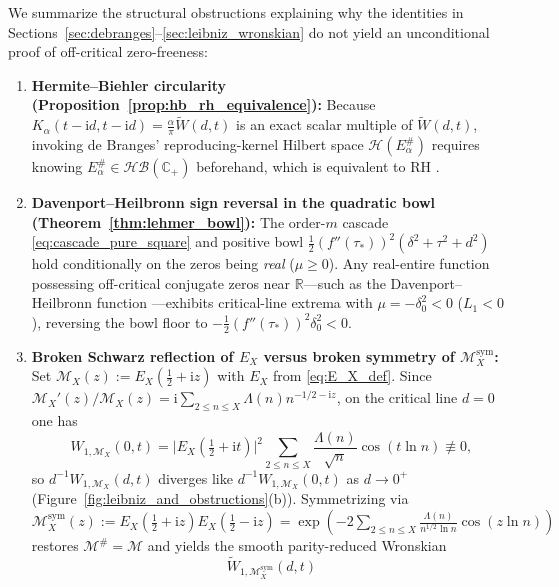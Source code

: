 \documentclass[11pt,reqno]{amsart}
\theoremstyle{definition}
\theoremstyle{remark}
\numberwithin{equation}{section}
\newcommand{\ii}{\mathrm{i}}
\begin{document}
We summarize the structural obstructions explaining why the identities in Sections~\ref{sec:debranges}--\ref{sec:leibniz_wronskian} do not yield an unconditional proof of off-critical zero-freeness:
\begin{enumerate}[label=\textup{(\arabic*)},leftmargin=2.2em]
  \item \textbf{Hermite--Biehler circularity (Proposition~\ref{prop:hb_rh_equivalence}):} Because $K_\alpha(t-\ii d, t-\ii d) = \frac{\alpha}{\pi}\widetilde{W}(d,t)$ is an exact scalar multiple of $\widetilde{W}(d,t)$, invoking de Branges' reproducing-kernel Hilbert space $\mathcal{H}(E_\alpha^\#)$ requires knowing $E_\alpha^\# \in \mathcal{HB}(\mathbb{C}_+)$ beforehand, which is equivalent to RH \cite{Levinson1974,Lagarias2005,Lagarias2006}.
  \item \textbf{Davenport--Heilbronn sign reversal in the quadratic bowl (Theorem~\ref{thm:lehmer_bowl}):} The order-$m$ cascade \eqref{eq:cascade_pure_square} and positive bowl $\frac{1}{2}(f''(\tau_*))^2(\delta^2 + \tau^2 + d^2)$ hold conditionally on the zeros being \emph{real} ($\mu \ge 0$). Any real-entire function possessing off-critical conjugate zeros near $\mathbb{R}$---such as the Davenport--Heilbronn function \cite{DavenportHeilbronn1936,Titchmarsh1986}---exhibits critical-line extrema with $\mu = -\delta_0^2 < 0$ ($L_1 < 0$), reversing the bowl floor to $-\frac{1}{2}(f''(\tau_*))^2\delta_0^2 < 0$.
  \item \textbf{Broken Schwarz reflection of $E_X$ versus broken symmetry of $\mathcal{M}_X^{\mathrm{sym}}$:} Set $\mathcal{M}_X(z) := E_X(\frac{1}{2}+\ii z)$ with $E_X$ from \eqref{eq:E_X_def}. Since $\mathcal{M}_X'(z)/\mathcal{M}_X(z) = \ii\sum_{2\le n\le X}\Lambda(n)n^{-1/2-\ii z}$, on the critical line $d = 0$ one has
  \begin{equation}\label{eq:W_1E_d0_nonzero}
    W_{1,\mathcal{M}_X}(0,t) = \bigl\lvert E_X(\tfrac{1}{2}+\ii t)\bigr\rvert^2 \sum_{2 \le n \le X}\frac{\Lambda(n)}{\sqrt{n}}\cos(t\ln n) \not\equiv 0,
  \end{equation}
  so $d^{-1}W_{1,\mathcal{M}_X}(d,t)$ diverges like $d^{-1}W_{1,\mathcal{M}_X}(0,t)$ as $d \to 0^+$ (Figure~\ref{fig:leibniz_and_obstructions}(b)). Symmetrizing via $\mathcal{M}_X^{\mathrm{sym}}(z) := E_X(\frac{1}{2}+\ii z)E_X(\frac{1}{2}-\ii z) = \exp(-2\sum_{2\le n\le X}\frac{\Lambda(n)}{n^{1/2}\ln n}\cos(z\ln n))$ restores $\mathcal{M}^\# = \mathcal{M}$ and yields the smooth parity-reduced Wronskian
  \begin{equation}\label{eq:W_1Msym_explicit}
    \widetilde{W}_{1,\mathcal{M}_X^{\mathrm{sym}}}(d,t)

\end{equation}
\end{enumerate}
\end{document}
